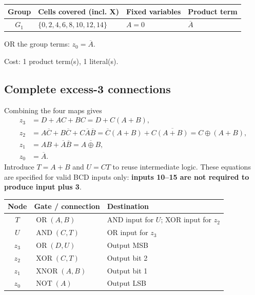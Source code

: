\documentclass[a4paper,11pt]{article}
\begin{document}
\begin{minipage}{\textwidth}
\begin{center}\small
\begin{tabular}{clll}
\toprule
Group & Cells covered (incl. X) & Fixed variables & Product term\\\midrule
\textcolor{blue!75!black}{$G_{1}$} & $\{0,2,4,6,8,10,12,14\}$ & $A=0$ & $\overline{A}$\\
\bottomrule\end{tabular}\end{center}


\noindent OR the group terms: $\boxed{z_0=\overline{A}}$.

\noindent Cost: 1 product term(s), 1 literal(s).

\end{minipage}\par\vspace{0.25cm}

\clearpage\subsection{Complete excess-3 connections}
Combining the four maps gives
\begin{align*}
z_3&=D+AC+BC=D+C(A+B),\\
z_2&=A\overline C+B\overline C+C\overline A\overline B
      =\overline C(A+B)+C\overline{(A+B)}=C\oplus(A+B),\\
z_1&=AB+\overline A\overline B=\overline{A\oplus B},\\
z_0&=\overline A.
\end{align*}
Introduce $T=A+B$ and $U=CT$ to reuse intermediate logic. These equations are specified
for valid BCD inputs only: \textbf{inputs 10--15 are not required to produce input plus 3}.


\begin{center}\small
\begin{tabular}{cll}
\toprule
Node & Gate / connection & Destination\\\midrule
$T$ & $\operatorname{OR}(A,B)$ & AND input for $U$; XOR input for $z_2$\\
$U$ & $\operatorname{AND}(C,T)$ & OR input for $z_3$\\
$z_3$ & $\operatorname{OR}(D,U)$ & Output MSB\\
$z_2$ & $\operatorname{XOR}(C,T)$ & Output bit 2\\
$z_1$ & $\operatorname{XNOR}(A,B)$ & Output bit 1\\
$z_0$ & $\operatorname{NOT}(A)$ & Output LSB\\
\bottomrule\end{tabular}\end{center}
\end{document}

